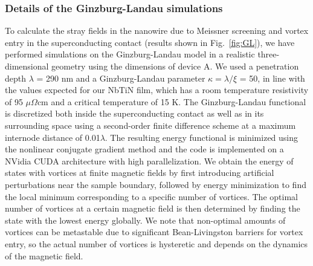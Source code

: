 \subsubsection{Details of the Ginzburg-Landau simulations}
To calculate the stray fields in the nanowire due to Meissner screening and vortex entry in the superconducting contact (results shown in Fig.~\ref{fig:GL}), we have performed simulations on the Ginzburg-Landau model \cite{Gropp1996} in a realistic three-dimensional geometry using the dimensions of device A.
We used a penetration depth $\lambda$ = 290 nm and a Ginzburg-Landau parameter $\kappa = \lambda / \xi$ = 50, in line with the values expected for our NbTiN film, which has a room temperature resistivity of 95 $\mu \Omega$cm and a critical temperature of 15 K.
The Ginzburg-Landau functional is discretized both inside the superconducting contact as well as in its surrounding space \cite{Du1999} using a second-order finite difference scheme at a maximum internode distance of 0.01$\lambda$.
The resulting energy functional is minimized using the nonlinear conjugate gradient method and the code is implemented on a NVidia CUDA architecture with high parallelization.
We obtain the energy of states with vortices at finite magnetic fields by first introducing artificial perturbations near the sample boundary, followed by energy minimization to find the local minimum corresponding to a specific number of vortices.
The optimal number of vortices at a certain magnetic field is then determined by finding the state with the lowest energy globally.
We note that non-optimal amounts of vortices can be metastable due to significant Bean-Livingston barriers for vortex entry, so the actual number of vortices is hysteretic and depends on the dynamics of the magnetic field.

